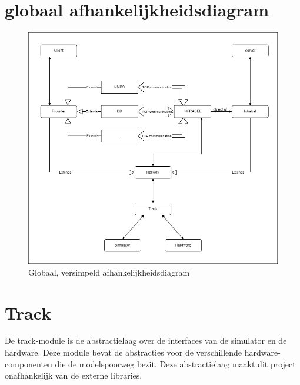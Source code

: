 \documentclass[a4paper, 11pt]{article}
\newcommand{\<}{\scriptsize\textless\normalsize}
\renewcommand{\>}{\scriptsize\textgreater\normalsize}
\begin{document}
\section{globaal afhankelijkheidsdiagram} %
\begin{figure}[h]
	\begin{center}
		\includegraphics[scale=.5]{Afhankelijkheidsdiagrammen/global.png}
		\caption{Globaal, versimpeld afhankelijkheidsdiagram}
	\end{center}
\end{figure}

\newpage
\section{Track} %
De track-module is de abstractielaag over de interfaces van de simulator en de hardware. Deze module bevat de abstracties voor de verschillende hardware-componenten die de modelspoorweg bezit. Deze abstractielaag maakt dit project onafhankelijk van de externe libraries.
\end{document}
